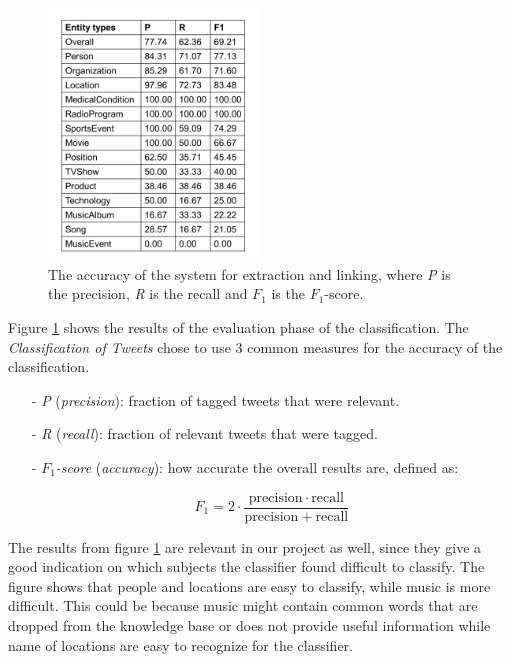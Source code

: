 \begin{figure}[H]
\centering
\includegraphics[width=0.5\textwidth]{Chapters/PreviousWork/Classification_entities}
\caption[The accuracy of the system for extraction and linking]{The accuracy of the system for extraction and linking, where \emph{P} is the precision, \emph{R} is the recall and \emph{$F_{1}$} is the \emph{$F_{1}$}-score.}
\label{fig:classification_entities}
\end{figure}


Figure \ref{fig:classification_entities} shows the results of the evaluation phase of the classification. The \emph{Classification of Tweets} chose to use 3 common measures for the accuracy of the classification. 
\begin{itemize}
\item[-] \emph{P} (\emph{precision}): fraction of tagged tweets that were relevant. 
\item[-] \emph{R} (\emph{recall}): fraction of relevant tweets that were tagged. 
\item[-] \emph{$F_{1}$-score} (\emph{accuracy}): how accurate the overall results are, defined as:

\[F_1 = 2 \cdot \frac{\mathrm{precision} \cdot \mathrm{recall}}{\mathrm{precision} + \mathrm{recall}}\]
\end{itemize}
The results from figure \ref{fig:classification_entities} are relevant in our project as well, since they give a good indication on which subjects the classifier found difficult to classify. The figure shows that people and locations are easy to classify, while music is more difficult. This could be because music might contain common words that are dropped from the knowledge base or does not provide useful information while name of locations are easy to recognize for the classifier. 

